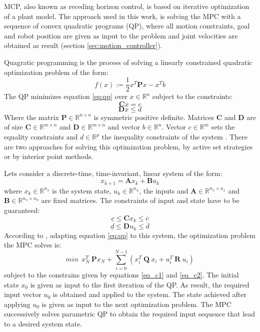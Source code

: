 MCP, also known as receding horizon control, is based on iterative optimization of a plant model. The approach used in this work, is solving the MPC with a sequence of convex quadratic programs (QP), where all motion constraints, goal and robot position are given as input to the problem and joint velocities are obtained as result (section \ref{sec:motion_controller}).

Quagratic programming is the process of solving a linearly constrained quadratic optimization problem of the form:
\begin{equation}
f(x):= \frac{1}{2}x^{T}\textbf{P}x - x^{T}b 
\label{eq:qp}
\end{equation}
The QP minimizes equation \ref{eq:qp} over $x \in \mathbb{R} ^{n}$ subject to the constraints:
$$\textbf{C}x = c $$
$$\textbf{D}x \leq d$$
Where the matrix $\textbf{P} \in \mathbb{R} ^{n \times n}$ is symmetric positive definite. Matrices $\textbf{C}$ and $\textbf{D}$ are of size $\textbf{C} \in \mathbb{R} ^{m \times n}$ and $\textbf{D} \in \mathbb{R} ^{m \times n}$ and vector $b \in \mathbb{R} ^{n}$. Vector  $c \in \mathbb{R} ^{m}$ sets the equality constraints and $d \in \mathbb{R} ^{p}$ the inequality constraints of the system \citep{qp_theory}. There are two approaches for solving this optimization problem, by active set strategies or by interior point methods.

Lets consider a discrete-time, time-invariant, linear system of the form:
\begin{equation}
x_{k+1} =  \textbf{A}x_{k} + \textbf{B}u_{k}
\end{equation} 
where $x_{k} \in \mathbb{R} ^{n_{x}}$ is the system state, $u_{k} \in \mathbb{R} ^{n_{u}}$, the inputs and $\textbf{A} \in \mathbb{R} ^{n_{x} \times n_{x}}$  and $\textbf{B} \in \mathbb{R} ^{n_{x} \times n_{u}}$ are fixed matrices. The constraints of input and state have to be guaranteed:
\begin{equation}
\underline{c} \leq \textbf{C}x_k \leq \overline{c}
\label{eq_c1}
\end{equation} 
\begin{equation}
\underline{d} \leq \textbf{D}u_k \leq \overline{d}
\label{eq_c2}
\end{equation} 
According to \citet{qp_algorithm}, adapting equation \ref{eq:qp} to this system, the optimization problem the MPC solves is:
\begin{equation}
min\ \ x_{N}^{T}\ \textbf{P}x_N + \sum_{i=0}^{N-1} (x_{i}^{T}\ \textbf{Q}\ x_i + u_{i}^{T}\ \textbf{R}\ u_i)
\end{equation} 
subject to the constrains given by equations \ref{eq_c1} and \ref{eq_c2}. The initial state $x_0$ is given as input to the first iteration of the QP. As result, the required input vector $u_0$ is obtained and applied to the system. The state achieved after applying $u_0$ is given as input to the next optimization problem. The MPC successively solves parametric QP to obtain the required input sequence that lead to a desired system state.


